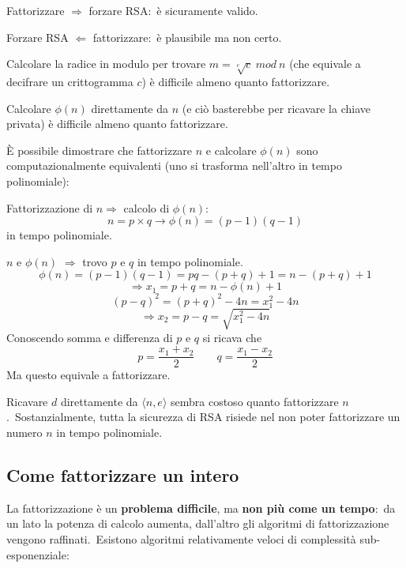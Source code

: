\begin{center}
    Fattorizzare $\Rightarrow$ forzare RSA:\ è sicuramente valido.

    Forzare RSA $\Leftarrow$ fattorizzare:\ è plausibile ma non certo.
\end{center}

\noindent Calcolare la radice in modulo per trovare $m = \sqrt[e] c\ \mathit{mod}\ n$ (che equivale a decifrare un crittogramma $c$) è difficile almeno quanto fattorizzare.\

Calcolare $\phi(n)$ direttamente da $n$ (e ciò basterebbe per ricavare la chiave privata) è difficile almeno quanto fattorizzare.\

È possibile dimostrare che fattorizzare $n$ e calcolare $\phi(n)$ sono computazionalmente equivalenti (uno si trasforma nell'altro in tempo polinomiale):\

\vspace{12pt}

\noindent Fattorizzazione di $n \Rightarrow$ calcolo di $\phi(n)$:\ \[n = p \times q \rightarrow \phi(n) = (p - 1)(q - 1)\] in tempo polinomiale.\

\vspace{12pt}

$n$ e $\phi(n)$ $\Rightarrow$ trovo $p$ e $q$ in tempo polinomiale.
\[\phi(n) = (p-1)(q-1) = pq - (p+q) + 1 = n - (p+q) + 1\]
\[\Rightarrow x_1 = p+q = n - \phi(n) +1\]
\[(p-q)^2 = (p + q)^2 - 4n = x_1^2 - 4n\]
\[\Rightarrow x_2 = p-q = \sqrt{x_1^2 - 4n}\]
Conoscendo somma e differenza di $p$ e $q$ si ricava che
\[p = \frac{x_1 + x_2}{2}\qquad q = \frac{x_1 - x_2}{2} \]
Ma questo equivale a fattorizzare.\

\vspace{12pt}
\noindent Ricavare $d$ direttamente da $\langle n, e\rangle$ sembra costoso quanto fattorizzare $n$.\
Sostanzialmente, tutta la sicurezza di RSA risiede nel non poter fattorizzare un numero $n$ in tempo polinomiale.\

\subsection{Come fattorizzare un intero}

La fattorizzazione è un \textbf{problema difficile}, ma \textbf{non più come un tempo}:\ da un lato la potenza di calcolo aumenta, dall'altro gli algoritmi di fattorizzazione vengono raffinati.\
Esistono algoritmi relativamente veloci di complessità sub-esponenziale:

